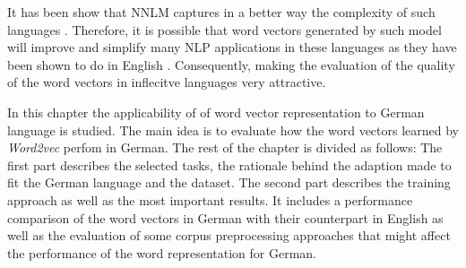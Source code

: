 It has been show that \ac{NNLM} captures in a  better  way the complexity of such languages
\cite{conf/icassp/MikolovKBGC09,DBLP:journals/corr/MikolovLS13}.
Therefore, it is possible that word vectors generated by such model  will 
improve  and simplify many \ac{NLP} applications in
these languages as they have been shown to do in
English \cite{collobert:2008,Turian:2010:WRS:1858681.1858721}.
Consequently, making the evaluation of the quality of the word vectors in
inflecitve languages very attractive.

In this chapter the applicability of of word vector representation to German
language is studied. The main idea is to evaluate how the word vectors
learned by \textit{Word2vec} perfom in German.   The rest of the chapter is
divided as follows: The first part describes the 
selected tasks, the rationale behind the adaption made to fit the German
language and the dataset. The second part describes the training approach as well as the most
important results. It includes  a performance comparison of the word
vectors in German with their counterpart in English as well as  the evaluation of  some corpus
preprocessing approaches that might affect the performance of the word
representation for German.










